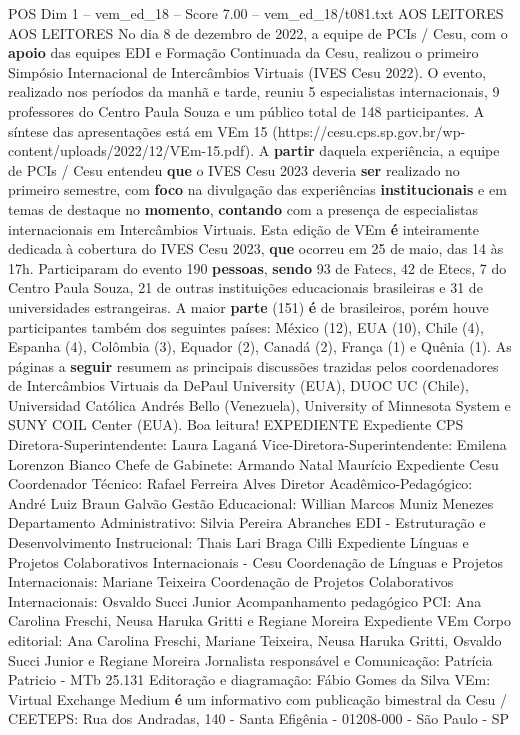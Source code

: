\begin{textsample}{POS Dim 1 – vem\_ed\_18 – Score 7.00 – vem\_ed\_18/t081.txt}  \label{ex:f1_pos_114}
AOS LEITORES AOS LEITORES No dia 8 de dezembro de 2022, a equipe de PCIs / Cesu, com o \textbf{apoio} das equipes EDI e Formação Continuada da Cesu, realizou o primeiro Simpósio Internacional de Intercâmbios Virtuais (IVES Cesu 2022).
O evento, realizado nos períodos da manhã e tarde, reuniu 5 especialistas internacionais, 9 professores do Centro Paula Souza e um público total de 148 participantes.
A síntese das apresentações está em VEm 15 (https://cesu.cps.sp.gov.br/wp-content/uploads/2022/12/VEm-15.pdf).
A \textbf{partir} daquela experiência, a equipe de PCIs / Cesu entendeu \textbf{que} o IVES Cesu 2023 deveria \textbf{ser} realizado no primeiro semestre, com \textbf{foco} na divulgação das experiências \textbf{institucionais} e em temas de destaque no \textbf{momento}, \textbf{contando} com a presença de especialistas internacionais em Intercâmbios Virtuais.
Esta edição de VEm \textbf{é} inteiramente dedicada à cobertura do IVES Cesu 2023, \textbf{que} ocorreu em 25 de maio, das 14 às 17h.
Participaram do evento 190 \textbf{pessoas}, \textbf{sendo} 93 de Fatecs, 42 de Etecs, 7 do Centro Paula Souza, 21 de outras instituições educacionais brasileiras e 31 de universidades estrangeiras.
A maior \textbf{parte} (151) \textbf{é} de brasileiros, porém houve participantes também dos seguintes países: México (12), EUA (10), Chile (4), Espanha (4), Colômbia (3), Equador (2), Canadá (2), França (1) e Quênia (1).
As páginas a \textbf{seguir} resumem as principais discussões trazidas pelos coordenadores de Intercâmbios Virtuais da DePaul University (EUA), DUOC UC (Chile), Universidad Católica Andrés Bello (Venezuela), University of Minnesota System e SUNY COIL Center (EUA).
Boa leitura!
EXPEDIENTE Expediente CPS Diretora-Superintendente: Laura Laganá Vice-Diretora-Superintendente: Emilena Lorenzon Bianco Chefe de Gabinete: Armando Natal Maurício Expediente Cesu Coordenador Técnico: Rafael Ferreira Alves Diretor Acadêmico-Pedagógico: André Luiz Braun Galvão Gestão Educacional: Willian Marcos Muniz Menezes Departamento Administrativo: Silvia Pereira Abranches EDI - Estruturação e Desenvolvimento Instrucional: Thais Lari Braga Cilli Expediente Línguas e Projetos Colaborativos Internacionais - Cesu Coordenação de Línguas e Projetos Internacionais: Mariane Teixeira Coordenação de Projetos Colaborativos Internacionais: Osvaldo Succi Junior Acompanhamento pedagógico PCI: Ana Carolina Freschi, Neusa Haruka Gritti e Regiane Moreira Expediente VEm Corpo editorial: Ana Carolina Freschi, Mariane Teixeira, Neusa Haruka Gritti, Osvaldo Succi Junior e Regiane Moreira Jornalista responsável e Comunicação: Patrícia Patricio - MTb 25.131 Editoração e diagramação: Fábio Gomes da Silva VEm: Virtual Exchange Medium \textbf{é} um informativo com publicação bimestral da Cesu / CEETEPS: Rua dos Andradas, 140 - Santa Efigênia - 01208-000 - São Paulo - SP

\end{textsample}
